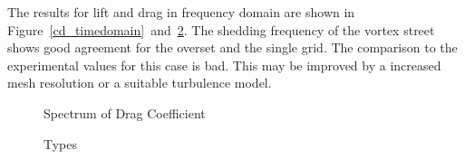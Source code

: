 \documentclass[a4paper,10pt]{scrartcl}
\begin{document}
%  

%  

% 

The results for lift and drag in frequency domain are shown in
Figure~\ref{cd_timedomain}~and~\ref{cl_spectra}. The shedding frequency of the
vortex street shows good agreement for the overset and the single grid. The
comparison to the experimental values for this case is bad. This may be
improved by a increased mesh resolution or a suitable turbulence model.

\begin{figure}[!htbp]
  \centering
  
  \caption{Spectrum of Drag Coefficient}
  \label{cd_spectra}
\end{figure}

\begin{figure}[!htbp]
  \centering
  
  \caption{Types}
  \label{cl_spectra}
\end{figure}
\end{document}
